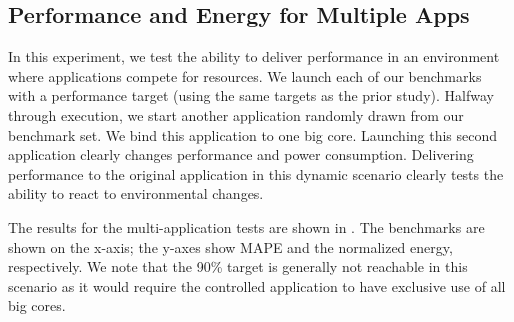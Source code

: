 



\subsection{Performance and Energy for Multiple Apps}
In this experiment, we test the ability to deliver performance in an
environment where applications compete for resources.  We launch each
of our benchmarks with a performance target (using the same targets as
the prior study).  Halfway through execution, we start another
application randomly drawn from our benchmark set.  We bind this
application to one big core.  Launching this second application
clearly changes performance and power consumption.  Delivering
performance to the original application in this dynamic scenario
clearly tests the ability to react to environmental changes.

The results for the multi-application tests are shown in
.  The benchmarks are shown
on the x-axis; the y-axes show MAPE and the normalized energy,
respectively.  We note that the 90\% target is generally not reachable
in this scenario as it would require the controlled application to
have exclusive use of all big cores.


